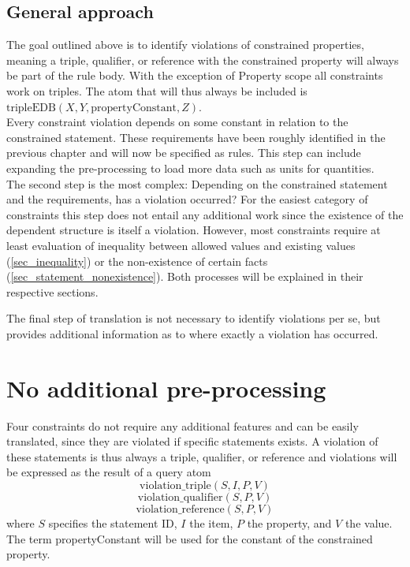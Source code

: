 \documentclass[hyperref,bachelorofscience,fleqn]{cgvpub}
\begin{document}
\subsection{General approach}
The goal outlined above is to identify violations of constrained properties, meaning a triple, qualifier, or reference with the constrained property will always be part of the rule body. With the exception of Property scope all constraints work on triples. The atom that will thus always be included is \(\text{tripleEDB}(X, Y, \text{propertyConstant}, Z)\).\\

Every constraint violation depends on some constant in relation to the constrained statement. These requirements have been roughly identified in the previous chapter and will now be specified as rules. This step can include expanding the pre-processing to load more data such as units for quantities.\\

The second step is the most complex: Depending on the constrained statement and the requirements, has a violation occurred? For the easiest category of constraints this step does not entail any additional work since the existence of the dependent structure is itself a violation. However, most constraints require at least evaluation of inequality between allowed values and existing values (\ref{sec_inequality}) or the non-existence of certain facts (\ref{sec_statement_nonexistence}). Both processes will be explained in their respective sections.

The final step of translation is not necessary to identify violations per se, but provides additional information as to where exactly a violation has occurred. 

\section{No additional pre-processing}\label{sec_no_preprocessing}
Four constraints do not require any additional features and can be easily translated, since they are violated if specific statements exists. A violation of these statements is thus always a triple, qualifier, or reference and violations will be expressed as the result of a query atom
\[\text{violation\_triple}(S, I, P, V)\]
\[\text{violation\_qualifier}(S, P, V)\]
\[\text{violation\_reference}(S, P, V)\]
where \(S\) specifies the statement ID, \(I\) the item, \(P\) the property, and \(V\) the value. The term propertyConstant will be used for the constant of the constrained property.
\end{document}
